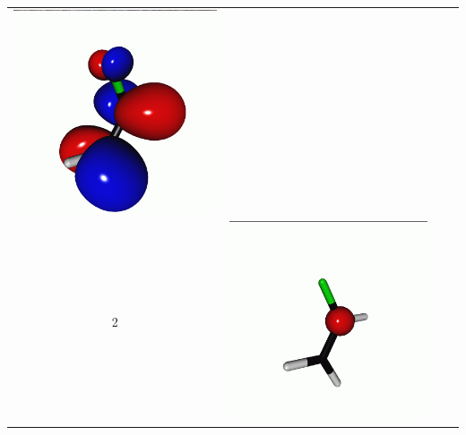\documentclass[journal=jctcce,manuscript=article]{achemso}
\begin{document}
\begin{table}[H]
\begin{tabular}{ c | c c c }
\begin{minipage}{0.2\textwidth}
         \includegraphics[scale=0.10]{NTO/CH2CHF/1p.png}
     \end{minipage}
     \\
         2 &  
     \begin{minipage}{0.2\textwidth}
         \centering
         \includegraphics[scale=0.10]{NTO/CH2CHF/2h.png}

\end{minipage}
\end{tabular}
\end{table}
\end{document}
